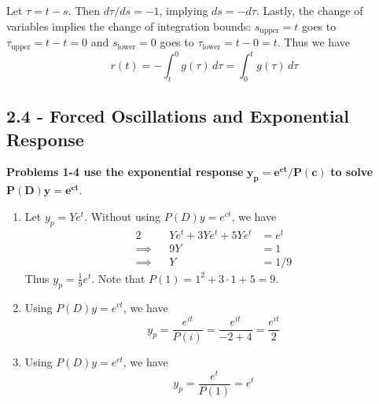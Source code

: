 \documentclass[a4paper]{article}
\begin{document}
Let \( \tau = t - s  \). Then \( d \tau / ds = -1 \), implying \( ds = -d \tau  \). Lastly, the change of variables implies the change of integration bounds: \( s_{\text{upper}} = t  \) goes to \( \tau_{\text{upper}} = t - t = 0 \) and \( s_{\text{lower}} = 0 \) goes to \( \tau_{\text{lower}} = t - 0 = t  \). Thus we have
\[
	r \!\left( t  \right) = -\int_{t }^{0} g \!\left( \tau  \right) \, d \tau = \int_{0}^{t } g \!\left( \tau  \right) \, d \tau   
\]

\newpage
\subsection{\textsf{2.4 - Forced Oscillations and Exponential Response}}

\textbf{Problems 1-4 use the exponential response } \( \pmb{y_{p } = e^{ct } / P \!\left( c  \right)} \) \textbf{ to solve } \( \pmb{P \!\left( D  \right) y = e^{ct }} \).

\vspace{12pt}


\begin{enumerate}[label=(\alph*)]
	\item Let \( y_{p } = Y e^{t } \). Without using \( P \!\left( D  \right) y = e^{ct } \), we have
	\begin{alignat*}{2}
		 && Ye^{t } + 3Ye^{t } + 5Ye^{t } & = e^{t } \\
		 \implies && 9Y & = 1 \\ 
		 \implies && Y & = 1 / 9
	\end{alignat*}
	Thus \( \displaystyle{y_{p } = \frac{1}{9} e^{t }} \). Note that \( P \!\left( 1 \right) = 1^{2} + 3 \cdot 1 + 5 = 9 \).
	\item Using \( P \!\left( D  \right)y = e^{ct} \), we have
	\[
		y_{p } = \frac{e^{it }}{P \!\left( i  \right)} = \frac{e^{it }}{-2 + 4} = \frac{e^{it }}{2}
	\]
	\item Using \( P \!\left( D  \right)y = e^{ct } \), we have
	\[
		y_{p } = \frac{e^{t }}{P \!\left( 1  \right)} = e^{t}
	\]
\end{enumerate}
\end{document}
